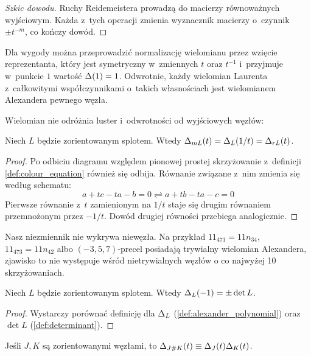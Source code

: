 \begin{proof}[Szkic dowodu]
    Ruchy Reidemeistera prowadzą do macierzy równoważnych wyjściowym.
    Każda z~tych operacji zmienia wyznacznik macierzy o~czynnik $\pm t^{-m}$, co kończy dowód.
\end{proof}

Dla wygody można przeprowadzić normalizację wielomianu przez wzięcie reprezentanta, który jest symetryczny w~zmiennych $t$ oraz $t^{-1}$ i~przyjmuje w~punkcie $1$ wartość $\Delta(1) = 1$.
Odwrotnie, każdy wielomian Laurenta z~całkowitymi współczynnikami o~takich własnościach jest wielomianem Alexandera pewnego węzła.

Wielomian nie odróżnia luster i~odwrotności od wyjściowych węzłów:

\begin{proposition}
    \label{prp:alexander_mirror_reverse}
    Niech $L$ będzie zorientowanym splotem.
    Wtedy $\Delta_{mL}(t) = \Delta_L(1/t) = \Delta_{rL}(t)$.
\end{proposition}

\begin{proof}
    Po odbiciu diagramu względem pionowej prostej skrzyżowanie z~definicji \ref{def:colour_equation} również się odbija.
    Równanie związane z~nim zmienia się według schematu:
    \begin{equation}
        a + tc - ta - b = 0 \rightleftharpoons a + tb - ta - c = 0
    \end{equation}
    Pierwsze równanie z~$t$ zamienionym na $1/t$ staje się drugim równaniem przemnożonym przez $-1/t$.
    Dowód drugiej równości przebiega analogicznie.
\end{proof}

Nasz niezmiennik nie wykrywa niewęzła.
Na przykład $11_{471} = 11n_{34}$, $11_{473} = 11n_{42}$ albo $(-3, 5, 7)$-precel posiadają trywialny wielomian Alexandera, zjawisko to nie występuje wśród nietrywialnych węzłów o co najwyżej 10 skrzyżowaniach.

\begin{proposition}
    \label{prp:alexander_det}
    Niech $L$ będzie zorientowanym splotem.
    Wtedy $\Delta_L(-1) = \pm \det L$.
\end{proposition}

\begin{proof}
    Wystarczy porównać definicję dla $\Delta_L$ (\ref{def:alexander_polynomial}) oraz $\det L$ (\ref{def:determinant}).
\end{proof}

\begin{proposition} \label{prp:alexander_multiplicative}
    Jeśli $J, K$ są zorientowanymi węzłami, to $\Delta_{J \mathbin{\#} K}(t) \equiv \Delta_J(t) \Delta_K(t)$.
\end{proposition}

